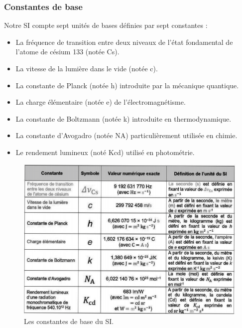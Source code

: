\documentclass{article}
\begin{document}
                \subsubsection{Constantes de base}
                Notre SI compte sept unités de bases définies par sept constantes :
                \begin{itemize}
                    \item La fréquence de transition entre deux niveaux de l'état fondamental de l'atome de césium 133 (notée Cs).
                    \item La vitesse de la lumière dans le vide (notée c).
                    \item La constante de Planck (notée h) introduite par la mécanique quantique.
                    \item La charge élémentaire (notée e) de l'électromagnétisme.
                    \item La constante de Boltzmann (notée k) introduite en thermodynamique.
                    \item La constante d'Avogadro (notée NA) particulièrement utilisée en chimie.
                    \item Le rendement lumineux (noté Kcd) utilisé en photométrie.
                \end{itemize}

                \begin{figure}[H]
                    \centering
                    \includegraphics[width=0.7\linewidth]{./images/009-constantes-SI.png}
                    \caption{Les constantes de base du SI.}
                \end{figure}
\end{document}

